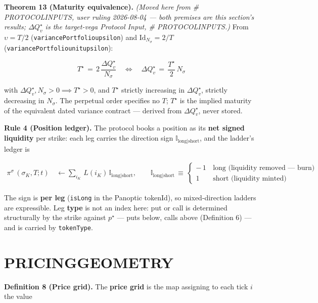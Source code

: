 \documentclass[11pt]{article}
\renewcommand{\_}{\textunderscore\allowbreak}
\begin{document}
\textbf{Theorem 13 (Maturity equivalence).} \emph{(Moved here from \# PROTOCOL\_INPUTS, user ruling 2026-08-04 --- both premises are this section's results; \(\Delta Q_v^{\star}\) is the target-vega Protocol Input, \# PROTOCOL\_INPUTS.)} From \(\upsilon = T/2\) (\texttt{variancePortfolio\_upsilon}) and \(\text{Id}_{N_\sigma} = 2/T\) (\texttt{variancePortfolio\_unit\_upsilon}):

\[
    T^{\star} \,=\, 2\,\frac{\Delta Q_v^{\star}}{N_\sigma} \quad\Longleftrightarrow\quad \Delta Q_v^{\star} \,=\, \frac{T^{\star}}{2}\, N_\sigma
\]

with \(\Delta Q_v^{\star}, N_\sigma > 0 \implies T^{\star} > 0\), and \(T^{\star}\) strictly increasing in \(\Delta Q_v^{\star}\), strictly decreasing in \(N_\sigma\). The perpetual order specifies no \(T\); \(T^{\star}\) is the implied maturity of the equivalent dated variance contract --- derived from \(\Delta Q_v^{\star}\), never stored.

\textbf{Rule 4 (Position ledger).} The protocol books a position as its \textbf{net signed liquidity} per strike: each leg carries the direction sign \(\mathbb{I}_{\text{long|short}}\), and the ladder's ledger is

\[
    \begin{aligned}
        \pi^{\sigma} \, (\sigma_K, T; t) \, &\leftarrow \sum_{i_K} \, L(i_K) \, \mathbb{I}_{\text{long|short}}, \qquad \mathbb{I}_{\text{long|short}} \, \equiv \,
        \begin{cases}
        - \, 1 & \, \text{long (liquidity removed — burn)} \\
        1 \, & \, \text{short (liquidity minted)}
        \end{cases}
    \end{aligned}
\]

The sign is \textbf{per leg} (\texttt{isLong} in the Panoptic tokenId), so mixed-direction ladders are expressible. Leg \textbf{type} is not an index here: put or call is determined structurally by the strike against \(p^{\star}\) --- puts below, calls above (Definition 6) --- and is carried by \texttt{tokenType}.

\section*{PRICING\_GEOMETRY}\label{pricing_geometry}

\textbf{Definition 8 (Price grid).} The \textbf{price grid} is the map assigning to each tick \(i\) the value
\end{document}
